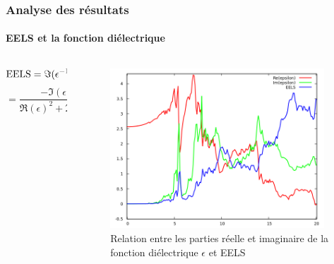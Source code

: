 \documentclass[french]{beamer}
\newcommand{\V}[1]{\textnormal{#1}}
\begin{document}
\begin{frame}
\frametitle{Analyse des résultats}
\framesubtitle{EELS et la fonction diélectrique}
\begin{columns}
  \begin{column}{\paperwidth-10pt}
  \centering
  $$
  \V{EELS}
  = \Im{(\epsilon^{-1})}
  $$
  $$
  = \frac{-\Im({\epsilon})}{\Re{(\epsilon)}^2 + \Im{(\epsilon)}^2}
  $$
  \end{column}
  \begin{column}{\paperwidth-10pt}
        \begin{figure}[!h]
      \centering
      \includegraphics[width=8cm]{epsilon_compare}
      \caption{\centering Relation entre les parties réelle et imaginaire de la fonction diélectrique $\epsilon$ et EELS}\label{fig-epsilon_compare}
    \end{figure}
  \end{column}
\end{columns}

\end{frame}
\end{document}
